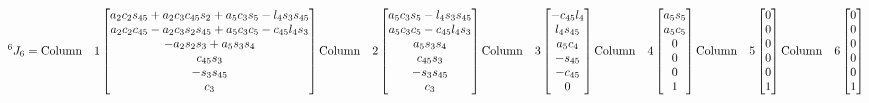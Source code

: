 \documentclass[letterpaper]{article}
\begin{document}
\begin{dmath}
^6J_6  = \\
\mathrm{ Column \quad1}\\
\left[\begin{matrix}a_{2} c_{2} s_{45} + a_{2} c_{3} c_{45} s_{2} + a_{5} c_{3} s_{5} - l_{4} s_{3} s_{45}\\a_{2} c_{2} c_{45} - a_{2} c_{3} s_{2} s_{45} + a_{5} c_{3} c_{5} - c_{45} l_{4} s_{3}\\- a_{2} s_{2} s_{3} + a_{5} s_{3} s_{4}\\c_{45} s_{3}\\- s_{3} s_{45}\\c_{3}\end{matrix}\right]
\\ 
\mathrm{ Column \quad2}\\
\left[\begin{matrix}a_{5} c_{3} s_{5} - l_{4} s_{3} s_{45}\\a_{5} c_{3} c_{5} - c_{45} l_{4} s_{3}\\a_{5} s_{3} s_{4}\\c_{45} s_{3}\\- s_{3} s_{45}\\c_{3}\end{matrix}\right]
\\ 
\mathrm{ Column \quad3}\\
\left[\begin{matrix}- c_{45} l_{4}\\l_{4} s_{45}\\a_{5} c_{4}\\- s_{45}\\- c_{45}\\0\end{matrix}\right]
\\ 
\mathrm{ Column \quad4}\\
\left[\begin{matrix}a_{5} s_{5}\\a_{5} c_{5}\\0\\0\\0\\1\end{matrix}\right]
\\ 
\mathrm{ Column \quad5}\\
\left[\begin{matrix}0\\0\\0\\0\\0\\1\end{matrix}\right]
\\ 
\mathrm{ Column \quad6}\\
\left[\begin{matrix}0\\0\\0\\0\\0\\1\end{matrix}\right]
\\ 
\end{dmath}
 
\end{document}
